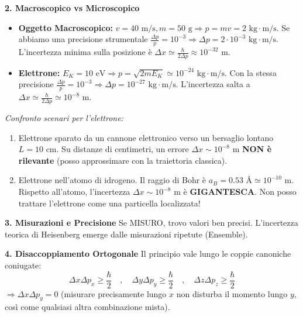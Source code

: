 \documentclass[11pt, a4paper]{article}
\begin{document}
\noindent
\textbf{2. Macroscopico vs Microscopico} %
\begin{itemize}
    \item \textbf{Oggetto Macroscopico:} $v = 40 \text{ m/s}, m = 50 \text{ g} \Rightarrow p = mv = 2 \text{ kg}\cdot\text{m/s}$. %
    Se abbiamo una precisione strumentale $\frac{\Delta p}{p} = 10^{-3} \Rightarrow \Delta p = 2 \cdot 10^{-3} \text{ kg}\cdot\text{m/s}$. %
    L'incertezza minima sulla posizione è $\Delta x \simeq \frac{\hbar}{2\Delta p} \approx 10^{-32} \text{ m}$. %
    \item \textbf{Elettrone:} $E_K = 10 \text{ eV} \Rightarrow p = \sqrt{2mE_K} \simeq 10^{-24} \text{ kg}\cdot\text{m/s}$. %
    Con la stessa precisione $\frac{\Delta p}{p} = 10^{-3} \Rightarrow \Delta p = 10^{-27} \text{ kg}\cdot\text{m/s}$. %
    L'incertezza salta a $\Delta x \simeq \frac{\hbar}{2\Delta p} \simeq 10^{-8} \text{ m}$. %
\end{itemize}

\textit{Confronto scenari per l'elettrone:} %
\begin{enumerate}
    \item[a)] Elettrone sparato da un cannone elettronico verso un bersaglio lontano $L = 10 \text{ cm}$. Su distanze di centimetri, un errore $\Delta x \sim 10^{-8} \text{ m}$ \textbf{NON è rilevante} (posso approssimare con la traiettoria classica). %
    \item[b)] Elettrone nell'atomo di idrogeno. Il raggio di Bohr è $a_B = 0.53 \text{ \AA} \simeq 10^{-10} \text{ m}$. Rispetto all'atomo, l'incertezza $\Delta x \sim 10^{-8} \text{ m}$ è \textbf{GIGANTESCA}. Non posso trattare l'elettrone come una particella localizzata! %
\end{enumerate}

\noindent
\textbf{3. Misurazioni e Precisione} %
Se MISURO, trovo valori ben precisi. L'incertezza teorica di Heisenberg emerge dalle misurazioni ripetute (Ensemble). %

\noindent
\textbf{4. Disaccoppiamento Ortogonale} %
Il principio vale lungo le coppie canoniche coniugate: %
\begin{equation}
    \Delta x \Delta p_x \ge \frac{\hbar}{2} \quad , \quad \Delta y \Delta p_y \ge \frac{\hbar}{2} \quad , \quad \Delta z \Delta p_z \ge \frac{\hbar}{2} %
\end{equation}
$\Rightarrow \Delta x \Delta p_y = 0$ (misurare precisamente lungo $x$ non disturba il momento lungo $y$, così come qualsiasi altra combinazione mista). %
\end{document}
